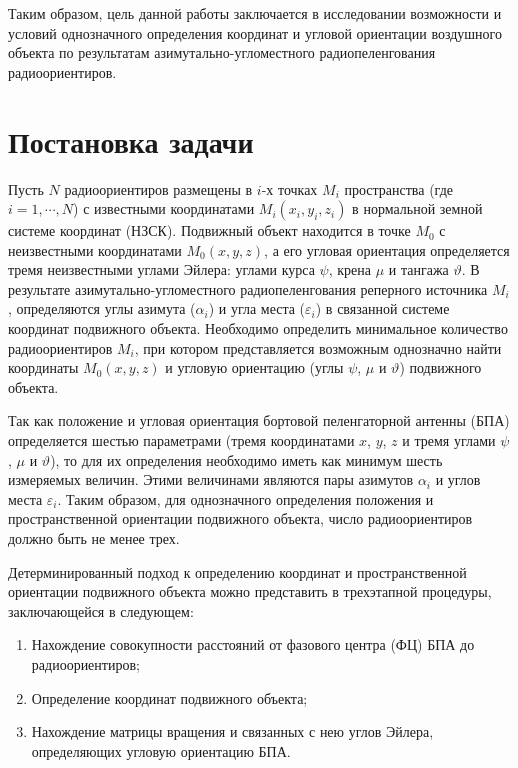 \documentclass[a4paper,12pt]{article}
\begin{document}
Таким образом, цель данной работы заключается в исследовании возможности и условий однозначного определения
координат и угловой ориентации воздушного объекта по результатам азимутально-угломестного радиопеленгования
радиоориентиров.

\section{Постановка задачи}
Пусть $N$ радиоориентиров размещены в $i$-х точках $M_i$ пространства (где $i = 1, \cdots, N$) с известными
координатами $M_i\left(x_i, y_i, z_i\right)$ в нормальной земной системе координат (НЗСК). Подвижный объект
находится в точке $M_0$ с неизвестными координатами $M_0\left(x, y, z\right)$, а его угловая ориентация
определяется тремя неизвестными углами Эйлера: углами курса $\psi$, крена $\mu$ и тангажа $\vartheta$.
В результате азимутально-угломестного радиопеленгования реперного источника $M_i$, определяются углы
азимута ($\alpha_i$) и угла места ($\varepsilon_i$) в связанной системе координат подвижного объекта. Необходимо
определить минимальное количество радиоориентиров $M_i$, при котором представляется возможным однозначно найти
координаты $M_0\left(x, y, z\right)$ и угловую ориентацию (углы $\psi$, $\mu$ и $\vartheta$) подвижного
объекта.

Так как положение и угловая ориентация бортовой пеленгаторной антенны (БПА) определяется шестью параметрами
(тремя координатами $x$, $y$, $z$ и тремя углами $\psi$, $\mu$ и $\vartheta$), то для их определения необходимо
иметь как минимум шесть измеряемых величин. Этими величинами являются пары азимутов $\alpha_i$ и углов места
$\varepsilon_i$. Таким образом, для однозначного определения положения и пространственной ориентации подвижного
объекта, число радиоориентиров должно быть не менее трех.

Детерминированный подход к определению координат и пространственной ориентации подвижного объекта можно представить
в трехэтапной процедуры, заключающейся в следующем:
\begin{enumerate}
    \item Нахождение совокупности расстояний от фазового центра (ФЦ) БПА до радиоориентиров;
    \item Определение координат подвижного объекта;
    \item Нахождение матрицы вращения и связанных с нею углов Эйлера, определяющих угловую ориентацию БПА.
\end{enumerate}
\end{document}
